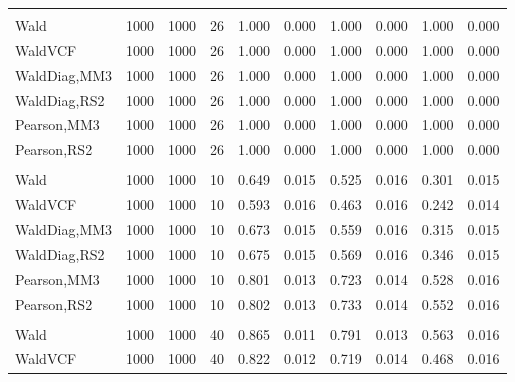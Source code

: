 \documentclass[
]{article}
\begin{document}
\begin{table}[H]
{\begin{tabular}[t]{lrrrrrrlrr}
\addlinespace[0.3em]
\multicolumn{10}{l}{\textbf{1F 15V}}\\
\hspace{1em}Wald & 1000 & 1000 & 26 & 1.000 & 0.000 & 1.000 & 0.000 & 1.000 & 0.000\\
\hspace{1em}WaldVCF & 1000 & 1000 & 26 & 1.000 & 0.000 & 1.000 & 0.000 & 1.000 & 0.000\\
\hspace{1em}WaldDiag,MM3 & 1000 & 1000 & 26 & 1.000 & 0.000 & 1.000 & 0.000 & 1.000 & 0.000\\
\hspace{1em}WaldDiag,RS2 & 1000 & 1000 & 26 & 1.000 & 0.000 & 1.000 & 0.000 & 1.000 & 0.000\\
\hspace{1em}Pearson,MM3 & 1000 & 1000 & 26 & 1.000 & 0.000 & 1.000 & 0.000 & 1.000 & 0.000\\
\hspace{1em}Pearson,RS2 & 1000 & 1000 & 26 & 1.000 & 0.000 & 1.000 & 0.000 & 1.000 & 0.000\\
\addlinespace[0.3em]
\multicolumn{10}{l}{\textbf{2F 10V}}\\
\hspace{1em}Wald & 1000 & 1000 & 10 & 0.649 & 0.015 & 0.525 & 0.016 & 0.301 & 0.015\\
\hspace{1em}WaldVCF & 1000 & 1000 & 10 & 0.593 & 0.016 & 0.463 & 0.016 & 0.242 & 0.014\\
\hspace{1em}WaldDiag,MM3 & 1000 & 1000 & 10 & 0.673 & 0.015 & 0.559 & 0.016 & 0.315 & 0.015\\
\hspace{1em}WaldDiag,RS2 & 1000 & 1000 & 10 & 0.675 & 0.015 & 0.569 & 0.016 & 0.346 & 0.015\\
\hspace{1em}Pearson,MM3 & 1000 & 1000 & 10 & 0.801 & 0.013 & 0.723 & 0.014 & 0.528 & 0.016\\
\hspace{1em}Pearson,RS2 & 1000 & 1000 & 10 & 0.802 & 0.013 & 0.733 & 0.014 & 0.552 & 0.016\\
\addlinespace[0.3em]
\multicolumn{10}{l}{\textbf{3F 15V}}\\
\hspace{1em}Wald & 1000 & 1000 & 40 & 0.865 & 0.011 & 0.791 & 0.013 & 0.563 & 0.016\\
\hspace{1em}WaldVCF & 1000 & 1000 & 40 & 0.822 & 0.012 & 0.719 & 0.014 & 0.468 & 0.016\\

\end{tabular}}
\end{table}
\end{document}
